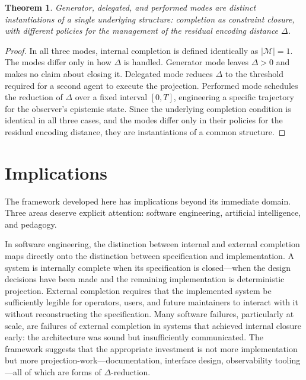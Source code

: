 \documentclass[12pt, twoside]{article}
\theoremstyle{plain}
\newtheorem{theorem}{Theorem}[section]
\theoremstyle{definition}
\theoremstyle{remark}
\begin{document}
\begin{theorem}
\label{thm:three-modes}
Generator, delegated, and performed modes are distinct instantiations of a single underlying structure: completion as constraint closure, with different policies for the management of the residual encoding distance $\Delta$.
\end{theorem}

\begin{proof}
In all three modes, internal completion is defined identically as $|\mathcal{M}| = 1$. The modes differ only in how $\Delta$ is handled. Generator mode leaves $\Delta > 0$ and makes no claim about closing it. Delegated mode reduces $\Delta$ to the threshold required for a second agent to execute the projection. Performed mode schedules the reduction of $\Delta$ over a fixed interval $[0, T]$, engineering a specific trajectory for the observer's epistemic state. Since the underlying completion condition is identical in all three cases, and the modes differ only in their policies for the residual encoding distance, they are instantiations of a common structure.
\end{proof}

\section{Implications}
\label{sec:implications}

The framework developed here has implications beyond its immediate domain. Three areas deserve explicit attention: software engineering, artificial intelligence, and pedagogy.

In software engineering, the distinction between internal and external completion maps directly onto the distinction between specification and implementation. A system is internally complete when its specification is closed---when the design decisions have been made and the remaining implementation is deterministic projection. External completion requires that the implemented system be sufficiently legible for operators, users, and future maintainers to interact with it without reconstructing the specification. Many software failures, particularly at scale, are failures of external completion in systems that achieved internal closure early: the architecture was sound but insufficiently communicated. The framework suggests that the appropriate investment is not more implementation but more projection-work---documentation, interface design, observability tooling---all of which are forms of $\Delta$-reduction.
\end{document}
